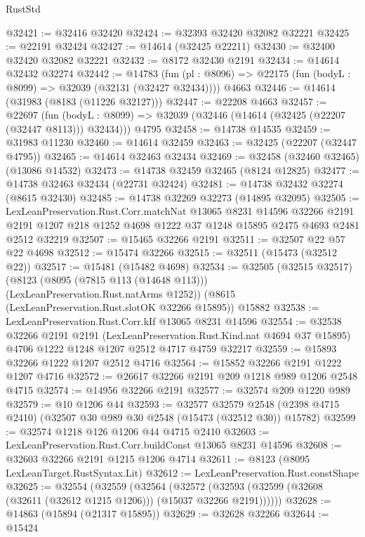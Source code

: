 \begin{lexlean}{RustStd}
\begin{coremodule}
@32421 := @32416 @32420
@32424 := @32393 @32420 @32082 @32221
@32425 := @22191 @32424
@32427 := @14614 (@32425 @22211)
@32430 := @32400 @32420 @32082 @32221
@32432 := @8172 @32430 @2191
@32434 := @14614 @32432 @32274
@32442 := @14783
    (fun (pl : @8096) => @22175 (fun (bodyL : @8099) => @32039 (@32131 (@32427 @32434))))
    @4663
@32446 := @14614 (@31983 (@8183 (@11226 @32127)))
@32447 := @22208 @4663
@32457 := @22697
    (fun (bodyL : @8099) => @32039 (@32446 (@14614 (@32425 (@22207 (@32447 @8113))) @32434)))
    @4795
@32458 := @14738 @14535
@32459 := @31983 @11230
@32460 := @14614 @32459
@32463 := @32425 (@22207 (@32447 @4795))
@32465 := @14614 @32463 @32434
@32469 := @32458 (@32460 @32465) (@13086 @14532)
@32473 := @14738 @32459 @32465 (@8124 @12825)
@32477 := @14738 @32463 @32434 (@22731 @32424)
@32481 := @14738 @32432 @32274 (@8615 @32430)
@32485 := @14738 @32269 @32273 (@14895 @32095)
@32505 := LexLeanPreservation.Rust.Corr.matchNat
    @13065
    @8231
    @14596
    @32266
    @2191
    @2191
    @1207
    @218
    @1252
    @4698
    @1222
    @37
    @1248
    @15895
    @2475
    @4693
    @2481
    @2512
    @32219
@32507 := @15465 @32266 @2191
@32511 := @32507 @22 @57 @22 @4698
@32512 := @15474 @32266
@32515 := @32511 (@15473 (@32512 @22))
@32517 := @15481 (@15482 @4698)
@32534 := @32505
    (@32515 @32517)
    (@8123 (@8095 (@7815 @113 (@14648 @113))) (LexLeanPreservation.Rust.natArms @1252))
    (@8615 (LexLeanPreservation.Rust.slotOK @32266 @15895))
    @15882
@32538 := LexLeanPreservation.Rust.Corr.kIf @13065 @8231 @14596
@32554 := @32538
    @32266
    @2191
    @2191
    (LexLeanPreservation.Rust.Kind.nat @4694 @37 @15895)
    @4706
    @1222
    @1248
    @1207
    @2512
    @4717
    @4759
    @32217
@32559 := @15893 @32266 @1222 @1207 @2512 @4716
@32564 := @15852 @32266 @2191 @1222 @1207 @4716
@32572 := @26617 @32266 @2191 @209 @1218 @989 @1206 @2548 @4715
@32574 := @14956 @32266 @2191
@32577 := @32574 @209 @1220 @989
@32579 := @10 @1206 @44
@32593 := @32577
    @32579
    @2548
    (@2398 @4715 @2410)
    (@32507 @30 @989 @30 @2548 (@15473 (@32512 @30)) @15782)
@32599 := @32574 @1218 @126 @1206 @44 @4715 @2410
@32603 := LexLeanPreservation.Rust.Corr.buildConst @13065 @8231 @14596
@32608 := @32603 @32266 @2191 @1215 @1206 @4714
@32611 := @8123 (@8095 LexLeanTarget.RustSyntax.Lit)
@32612 := LexLeanPreservation.Rust.constShape
@32625 := @32554
    (@32559
      (@32564
        (@32572 (@32593 (@32599 (@32608 (@32611 (@32612 @1215 @1206))) (@15037 @32266 @2191))))))
@32628 := @14863 (@15894 (@21317 @15895))
@32629 := @32628 @32266
@32644 := @15424

\end{coremodule}
\end{lexlean}
